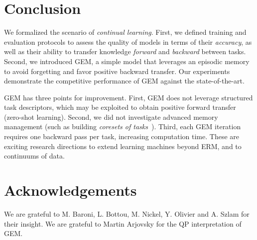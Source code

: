 \documentclass{article}
\begin{document}
\section{Conclusion}\label{sec:conclusion}
We formalized the scenario of \emph{continual learning}. First, we defined
training and evaluation protocols to assess the quality of models in terms of
their \emph{accuracy}, as well as their ability to transfer knowledge {\em
forward} and {\em backward} between tasks.  Second, we introduced GEM, a simple
model that leverages an episodic memory to avoid forgetting and favor positive
backward transfer. Our experiments demonstrate the competitive performance of
GEM against the state-of-the-art.

GEM has three points for improvement. First, GEM does not leverage structured
task descriptors, which may be exploited to obtain positive forward transfer
(zero-shot learning). Second, we did not investigate advanced memory management
(such as building \emph{coresets of tasks}~\citep{coresetMoG}). Third, each GEM
iteration requires one backward pass per task, increasing computation time.
These are exciting research directions to extend learning machines beyond ERM,
and to continuums of data.

\clearpage
\newpage

\section*{Acknowledgements}
We are grateful to M. Baroni, L. Bottou, M. Nickel, Y. Olivier and A. Szlam for
their insight. We are grateful to Martin Arjovsky for the QP interpretation of
GEM.


{
    \small
    
}

\clearpage
\newpage
\appendix

% 
% 
% 
% 
% 
% 
\end{document}
